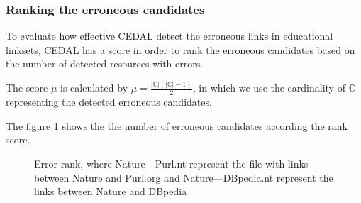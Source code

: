 \subsubsection{Ranking the erroneous candidates}
To evaluate how effective CEDAL detect the erroneous links in educational linksets, CEDAL has a score in order to rank the erroneous candidates based on the number of detected resources with errors.

The score $\mu$ is calculated by $\mu = \frac{|\mathbb{C}|(|\mathbb{C}| - 1)}{2}$, in which we use the cardinality of $\mathbb{C}$ representing the detected erroneous candidates. 

The figure \ref{fig:ErrorCounts} shows the the number of erroneous candidates according the rank score.

\newcommand{\slice}[4]{
  \pgfmathparse{0.5*#1+0.5*#2}
  \let\midangle\pgfmathresult

  \draw[thick,fill=black!10] (0,0) -- (#1:1) arc (#1:#2:1) -- cycle;

  \node[label=\midangle:#4] at (\midangle:1) {};

  \pgfmathparse{min((#2-#1-10)/110*(-0.3),0)}
  \let\temp\pgfmathresult
  \pgfmathparse{max(\temp,-0.5) + 0.8}
  \let\innerpos\pgfmathresult
  \node at (\midangle:\innerpos) {#3};
}

\begin{figure}[H]
	\centering
	{
		\label{fig:a1}
	}
	\caption{Error rank, where Nature---Purl.nt represent the file with links between Nature and Purl.org and Nature---DBpedia.nt represent the links between Nature and DBpedia}
	\label{fig:ErrorCounts}
\end{figure}




